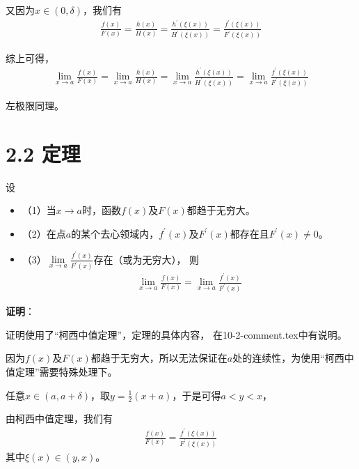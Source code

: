 \documentclass{article}
\begin{document}
\begin{itemize}
        又因为$x \in (0, \delta)$，我们有
        \begin{align*}
          \frac{f(x)}{F(x)}
          = \frac{h(x)}{H(x)}
          = \frac{h^\prime(\xi(x))}{H^\prime(\xi(x))}
          = \frac{f^\prime(\xi(x))}{F^\prime(\xi(x))}
        \end{align*}

        综上可得，
        \begin{align*}
          \lim\limits_{x \to a} \frac{f(x)}{F(x)}
          =\lim\limits_{x \to a} \frac{h(x)}{H(x)}
          = \lim\limits_{x \to a} \frac{h^\prime(\xi(x))}{H^\prime(\xi(x))}
          = \lim\limits_{x \to a} \frac{f^\prime(\xi(x))}{F^\prime(\xi(x))}
        \end{align*}

        左极限同理。
\end{itemize}


\section*{2.2 定理}

\begin{zremark}
  设
  \begin{itemize}
    \item （1）当$x \to a$时，函数$f(x)$及$F(x)$都趋于无穷大。
    \item （2）在点$a$的某个去心领域内，$f^\prime(x)$及$F^\prime(x)$都存在且$F^\prime(x) \not = 0$。
    \item （3）$\lim\limits_{x \to a} \frac{f^\prime(x)}{F^\prime(x)}$存在（或为无穷大），
          则
          \begin{align*}
            \lim\limits_{x \to a} \frac{f(x)}{F(x)} = \lim\limits_{x \to a} \frac{f^\prime(x)}{F^\prime(x)}
          \end{align*}
  \end{itemize}
\end{zremark}

\textbf{证明}：

证明使用了“柯西中值定理”，定理的具体内容，
在10-2-comment.tex中有说明。

因为$f(x)$及$F(x)$都趋于无穷大，所以无法保证在$a$处的连续性，为使用“柯西中值定理”需要特殊处理下。

任意$x \in (a, a + \delta)$，取$y = \frac{1}{2}(x + a)$，于是可得$a < y < x$，

由柯西中值定理，我们有
\begin{align*}
  \frac{f(x)}{F(x)} = \frac{f^\prime(\xi(x))}{F^\prime(\xi(x))}
\end{align*}
其中$\xi(x) \in (y, x)$。
\end{document}

